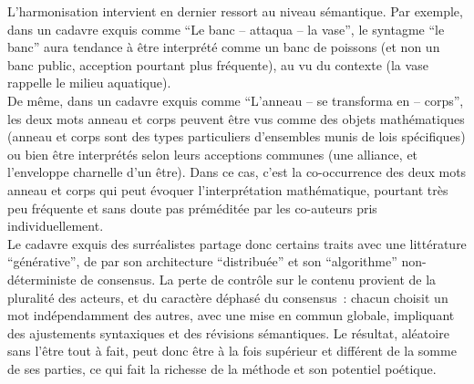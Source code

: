\documentclass{article}
\begin{document}
				L'harmonisation intervient en dernier ressort au niveau sémantique. Par exemple, dans un cadavre exquis comme ``Le banc -- attaqua -- la vase'', le syntagme ``le banc'' aura tendance à être interprété comme un banc de poissons (et non un banc public, acception pourtant plus fréquente), au vu du contexte (la vase rappelle le milieu aquatique).\\
				De même, dans un cadavre exquis comme ``L'anneau -- se transforma en -- corps'', les deux mots anneau et corps peuvent être vus comme des objets mathématiques (anneau et corps sont des types particuliers d'ensembles munis de lois spécifiques) ou bien être interprétés selon leurs acceptions communes (une alliance, et l'enveloppe charnelle d'un être). Dans ce cas, c'est la co-occurrence des deux mots anneau et corps qui peut évoquer l'interprétation mathématique, pourtant très peu fréquente et sans doute pas préméditée par les co-auteurs pris individuellement.\\
				
				Le cadavre exquis des surréalistes partage donc certains traits avec une littérature ``générative'', de par son architecture ``distribuée'' et son ``algorithme'' non-déterministe de consensus. La perte de contrôle sur le contenu provient de la pluralité des acteurs, et du caractère déphasé du consensus~: chacun choisit un mot indépendamment des autres, avec une mise en commun globale, impliquant des ajustements syntaxiques et des révisions sémantiques. Le résultat, aléatoire sans l'être tout à fait, peut donc être à la fois supérieur et différent de la somme de ses parties, ce qui fait la richesse de la méthode et son potentiel poétique.\\
				
\end{document}
